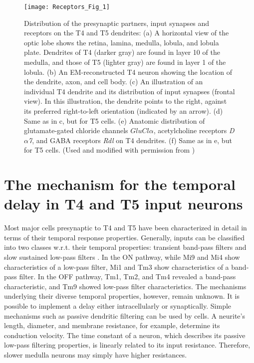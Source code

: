 \begin{figure}
\centering
\hspace*{-1cm} 
\texttt{[image: Receptors\_Fig\_1]}
\caption[Distribution of the presynaptic partners, input synapses and receptors on the T4 and T5 dendrites] {Distribution of the presynaptic partners, input synapses and receptors on the T4 and T5 dendrites: (a) A horizontal view of the optic lobe shows the retina, lamina, medulla, lobula, and lobula plate. Dendrites of T4 (darker gray) are found in layer 10 of the medulla, and those of T5 (lighter gray) are found in layer 1 of the lobula. (b) An EM-reconstructed T4 neuron showing the location of the dendrite, axon, and cell body. (c) An illustration of an individual T4 dendrite and its distribution of input synapses (frontal view). In this illustration, the dendrite points to the right, against its preferred right-to-left orientation (indicated by an arrow). (d) Same as in c, but for T5 cells. (e) Anatomic distribution of glutamate-gated chloride channels \textit{$GluCl\alpha$}, acetylcholine receptors \textit{D$\alpha$7}, and GABA receptors \textit{Rdl} on T4 dendrites. (f) Same as in e, but for T5 cells. (Used and modified with permission from \parencite{Fendl2020})} 
\label{fig:receptors}
\end{figure}

\section{The mechanism for the temporal delay in T4 and T5 input neurons}
Most major cells presynaptic to T4 and T5 have been characterized in detail in terms of their temporal response properties. Generally, inputs can be classified into two classes w.r.t. their temporal properties: transient band-pass filters and slow sustained low-pass filters \parencite{Arenz2017, Serbe2016}. In the ON pathway, while Mi9 and Mi4 show characteristics of a low-pass filter, Mi1 and Tm3 show characteristics of a band-pass filter. In the OFF pathway, Tm1, Tm2, and Tm4 revealed a band-pass characteristic, and Tm9 showed low-pass filter characteristics. The mechanisms underlying their diverse temporal properties, however, remain unknown. It is possible to implement a delay either intracellularly or synaptically. Simple mechanisms such as passive dendritic filtering can be used by cells. A neurite's length, diameter, and membrane resistance, for example, determine its conduction velocity. The time constant of a neuron, which describes its passive low-pass filtering properties, is linearly related to its input resistance. Therefore, slower medulla neurons may simply have higher resistances.


